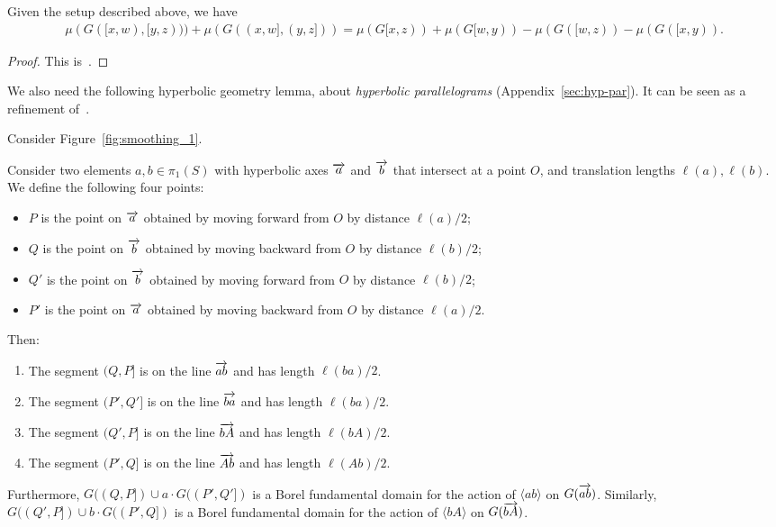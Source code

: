 \begin{lemma}
\label{lem:otalclaim}
Given the setup described above, we have 
\begin{multline*}
\mu(G([x,w), [y,z))) + \mu(G((x,w], (y,z])) = \mu(G[x,z)) + \mu(G[w,y))- \mu(G([w,z)) - \mu(G([x,y)).
\end{multline*}
\end{lemma}
\begin{proof}
This is~\cite[Lemma~6.2]{dRMG22:Duals}.
\end{proof}
We also need the following hyperbolic geometry lemma, about \emph{hyperbolic parallelograms} (Appendix~\ref{sec:hyp-par}). It can be seen as a refinement of~\cite[Lemma~5.6]{NCS23:Property}.

Consider Figure~\ref{fig:smoothing_1}. 


\begin{proposition}
Consider two elements $a, b \in \pi_1(S)$ with hyperbolic axes $\overrightarrow{a}$ and $\overrightarrow{b}$ that intersect at a point $O$, and translation lengths $\ell(a),\ell(b)$.
We define the following four points:

\begin{itemize} \item $P$ is the point on $\overrightarrow{a}$ obtained by moving forward from $O$ by distance $\ell(a)/2$;
\item $Q$ is the point on $\overrightarrow{b}$ obtained by moving backward from $O$ by distance $\ell(b)/2$;
\item $Q'$ is the point on $\overrightarrow{b}$ obtained by moving forward from $O$ by distance $\ell(b)/2$;
\item $P'$ is the point on $\overrightarrow{a}$ obtained by moving backward from $O$ by distance $\ell(a)/2$.
\end{itemize}
Then:
\begin{enumerate}
\item The segment $(Q,P]$ is on the line $\overrightarrow{ab}$ and has length $\ell(ba)/2$.
\item The segment $(P',Q']$ is on the line $\overrightarrow{ba}$ and has length $\ell(ba)/2$.
\item The segment $(Q',P]$ is on the line $\overrightarrow{bA}$ and has length $\ell(bA)/2$.
\item The segment $(P',Q]$ is on the line $\overrightarrow{Ab}$ and has length $\ell(Ab)/2$.
\end{enumerate}
Furthermore, $G((Q,P])\cup a\cdot
G((P',Q'])$ is a Borel fundamental domain for the
action of $\langle ab \rangle$ on $G(\overrightarrow{ab})$.
Similarly, $G((Q',P]) \cup b \cdot G((P',Q])$ is a Borel fundamental domain for
 the action of $\langle bA\rangle$ on $G(\overrightarrow{bA})$.
\label{prop:keygeometry}
\end{proposition}

